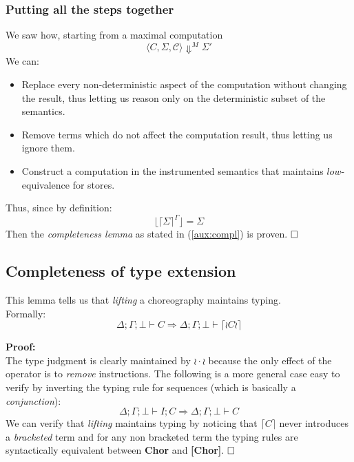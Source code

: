 \documentclass[12pt,a4paper,twoside]{book}
\newcommand{\qed}{\hfill\square}
\begin{document}
\subsubsection{Putting all the steps together}
We saw how, starting from a maximal computation
$$\langle C, \Sigma, \mathscr{C}\rangle \Downarrow^M \Sigma'$$
We can:
\begin{itemize}
\item Replace every non-deterministic aspect of the computation without changing the result, thus letting us reason only on the deterministic subset of the semantics.
\item Remove terms which do not affect the computation result, thus letting us ignore them.
\item Construct a computation in the instrumented semantics that maintains $low$-equivalence for stores.
\end{itemize}
Thus, since by definition:
$$ \lfloor \lceil \Sigma \rceil^\Gamma \rfloor = \Sigma $$
Then the \emph{completeness lemma} as stated in (\ref{aux:compl}) is proven. $\qed$


\subsection{Completeness of type extension}\label{aux:ext_tj}
This lemma tells us that \emph{lifting} a choreography maintains typing.\\
Formally:
$$
\Delta;\Gamma;\bot \vdash C \Rightarrow
\Delta;\Gamma;\bot \vdash \lceil \wr C \wr \rceil
$$

\noindent\textbf{Proof:}\\
The type judgment is clearly maintained by $\wr \cdot \wr$ because the only effect of the operator is to \emph{remove} instructions.
The following is a more general case easy to verify by inverting the typing rule for sequences (which is basically a \emph{conjunction}):
$$
\Delta;\Gamma;\bot \vdash I;C \Rightarrow \Delta;\Gamma;\bot \vdash C
$$
We can verify that \emph{lifting} maintains typing by noticing that $\lceil C \rceil$ never introduces a \emph{bracketed} term and for any non bracketed term the typing rules are syntactically equivalent between \textbf{Chor} and \textbf{[Chor]}.
$\qed$
\end{document}
